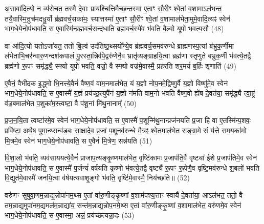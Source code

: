 {\anuvakamend[{अ॒भि खलु॒ वृष्टि॒श्छन्द॑सामे॒व रसे॑न प्र॒जामव॑ वैश्वदे॒वा वै ब्र॑ह्मवर्च॒सं यूप॒ एका॒न्नविꣳ॑श॒तिश्च॑। (7)।}]}

अ॒सावा॑दि॒त्यो न व्य॑रोचत॒ तस्मै॑ दे॒वाः प्राय॑श्चित्तिमैच्छ॒न्तस्मा॑ ए॒ताꣳ सौ॒रीꣳ श्वे॒तां व॒शामा\-ऽल॑भन्त॒ तयै॒वास्मि॒न्रुच॑मदधु॒र्यो ब्र॑ह्मवर्च॒सका॑मः॒ स्यात्तस्मा॑ ए॒ताꣳ सौ॒रीꣳ श्वे॒तां व॒शामाल॑भेता॒मुमे॒वादि॒त्यꣴ स्वेन॑ भाग॒धेये॒नोप॑धावति॒ स ए॒वास्मि॑न्ब्रह्मवर्च॒सन्द॑धाति ब्रह्मवर्च॒स्ये॑व भ॑वति बै॒ल्\mbox{}वो यूपो॑ भवत्य॒सौ (48)

वा आ॑दि॒त्यो यतो\-ऽजा॑यत॒ ततो॑ बि॒ल्व॑ उद॑तिष्ठ॒थ्सयो᳚न्ये॒व ब्र॑ह्मवर्च॒समव॑रुन्धे ब्राह्मणस्प॒त्यां ब॑भ्रुक॒र्णीमा ल॑भेताभि॒चर॑न्वारु॒णन्दश॑कपालं पु॒रस्ता॒न्निर्व॑पे॒द्वरु॑णेनै॒व भ्रातृ॑व्यङ्ग्राहयि॒त्वा ब्रह्म॑णा स्तृणुते बभ्रुक॒र्णी भ॑वत्ये॒तद्वै ब्रह्म॑णो रू॒पꣳ समृ॑द्ध्यै॒ स्फ्यो यूपो॑ भवति॒ वज्रो॒ वै स्फ्यो वज्र॑मे॒वास्मै॒ प्रह॑रति शर॒मयं॑ ब॒र्\mbox{}हिः शृ॒णाति॑ (49)

ए॒वैनं॒ वैभी॑दक इ॒द्ध्मो भि॒नत्त्ये॒वैनं॑ वैष्ण॒वं वा॑म॒नमाल॑भेत॒ यं य॒ज्ञो नोप॒नमे॒द्विष्णु॒र्वै य॒ज्ञो विष्णु॑मे॒व स्वेन॑ भाग॒धेये॒नोप॑धावति॒ स ए॒वास्मै॑ य॒ज्ञं प्रय॑च्छ॒त्युपै॑नं य॒ज्ञो न॑मति वाम॒नो भ॑वति वैष्ण॒वो ह्ये॑ष दे॒वत॑या॒ समृ॑द्ध्यै त्वा॒ष्ट्रं व॑ड॒बमाल॑भेत प॒शुका॑म॒स्त्वष्टा॒ वै प॑शू॒नां मि॑थु॒नानाम्᳚ (50)

प्र॒ज॒न॒यि॒ता त्वष्टा॑रमे॒व स्वेन॑ भाग॒धेये॒नोप॑धावति॒ स ए॒वास्मै॑ प॒शून्मि॑थु॒नान्प्रज॑नयति प्र॒जा हि वा ए॒तस्मि॑न्प॒शवः॒ प्रवि॑ष्टा॒ अथै॒ष पुमा॒न्थ्सन्व॑ड॒बः सा॒क्षादे॒व प्र॒जां प॒शूनव॑रुन्धे मै॒त्रꣴ श्वे॒तमाल॑भेत सङ्ग्रा॒मे सं य॑त्ते सम॒यका॑मो मि॒त्रमे॒व स्वेन॑ भाग॒धेये॒नोप॑धावति॒ स ए॒वैनं॑ मि॒त्रेण॒ सन्न॑यति (51)

वि॒शा॒लो भ॑वति॒ व्यव॑साययत्ये॒वैनं॑ प्राजाप॒त्यङ्कृ॒ष्णमाल॑भेत॒ वृष्टि॑कामः प्र॒जाप॑ति॒र्वै वृष्ट्या॑ ईशे प्र॒जाप॑तिमे॒व स्वेन॑ भाग॒धेये॒नोप॑धावति॒ स ए॒वास्मै॑ प॒र्जन्यं॑ वर्\mbox{}षयति कृ॒ष्णो भ॑वत्ये॒तद्वै वृष्ट्यै॑ रू॒पꣳ रू॒पेणै॒व वृष्टि॒मव॑रुन्धे श॒बलो॑ भवति वि॒द्युत॑मे॒वास्मै॑ जनयि॒त्वा व॑र्\mbox{}षयत्यवाशृ॒ङ्गो भ॑वति॒ वृष्टि॑मे॒वास्मै॒ निय॑च्छति॥ (52)

{\anuvakamend{श़ृ॒णाति॑ मिथु॒नाना᳚न्नयति यच्छति॥\scriptsize  (8)]}}

वरु॑णꣳ सुषुवा॒णम॒न्नाद्य॒न्नोपा॑नम॒थ्स ए॒तां वा॑रु॒णीङ्कृ॒ष्णां व॒शाम॑पश्य॒त्ताꣳ स्वायै॑ दे॒वता॑या॒ आ\-ऽल॑भत॒ ततो॒ वै तम॒न्नाद्य॒मुपा॑नम॒द्यमल॑म॒न्नाद्या॑य॒ सन्त॑म॒न्नाद्य॒न्नोप॒नमे॒थ्स ए॒तां वा॑रु॒णीङ्कृ॒ष्णां व॒शामाल॑भेत॒ वरु॑णमे॒व स्वेन॑ भाग॒धेये॒नोप॑धावति॒ स ए॒वास्मा॒ अन्नं॒ प्रय॑च्छत्यन्ना॒दः (53)

